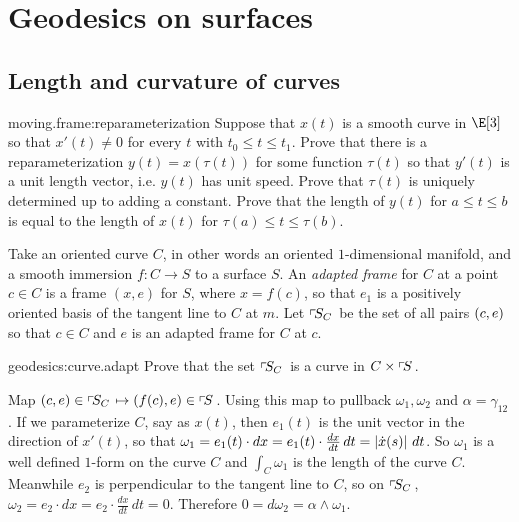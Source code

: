 \chapter{Geodesics on surfaces}\label{chapter:geodesics}%

\section{Length and curvature of curves}
\begin{problem}{moving.frame:reparameterization}
Suppose that \(x(t)\) is a smooth curve in \(\E[3]\) so that \(x'(t) \ne 0\) for every \(t\) with \(t_0 \le t \le t_1\).
Prove that there is a reparameterization \(y(t)=x(\tau(t))\) for some function \(\tau(t)\) so that \(y'(t)\) is a unit length vector, i.e. \(y(t)\) has unit speed.
Prove that \(\tau(t)\) is uniquely determined up to adding a constant.
Prove that the length of \(y(t)\) for \(a \le t \le b\) is equal to the length of \(x(t)\) for \(\tau(a) \le t \le \tau(b)\).
\end{problem}
Take an oriented curve \(C\), in other words an oriented \(1\)-dimensional manifold, and a smooth immersion \(f \colon C \to S\) to a surface \(S\).
An \emph{adapted frame}%
for \(C\) at a point \(c \in C\) is a frame \((x,e)\) for \(S\), where \(x=f(c)\), so that \(e_1\) is a positively oriented basis of the tangent line to \(C\) at \(m\).
Let \(\adaptedFrameBundle{C}{S}\) be the set of all pairs \(\pr{c,e}\) so that \(c \in C\) and \(e\) is an adapted frame for \(C\) at \(c\).
\begin{problem}{geodesics:curve.adapt}
Prove that the set \(\adaptedFrameBundle{C}{S}\) is a curve in \(C \times \frameBundle{S}\).
\end{problem}
Map \(\pr{c,e} \in \adaptedFrameBundle{C}{S} \mapsto \pr{f(c),e} \in \frameBundle{S}\).
Using this map to pullback \(\omega_1, \omega_2\) and \(\alpha=\gamma_{12}\).
If we parameterize \(C\), say as \(x(t)\), then \(e_1(t)\) is the unit vector in the direction of \(x'(t)\), so that \(\omega_1=e_1(t) \cdot dx=e_1(t) \cdot \frac{dx}{dt} \, dt=\norm{\dot{x}(s)} \, dt\).
So \(\omega_1\) is a well defined \(1\)-form on the curve \(C\) and \(\int_C \omega_1\) is the length of the curve \(C\).
Meanwhile \(e_2\) is perpendicular to the tangent line to \(C\), so on \(\adaptedFrameBundle{C}{S}\), \(\omega_2=e_2 \cdot dx=e_2 \cdot \frac{dx}{dt} \, dt=0\).
Therefore \(0=d\omega_2=\alpha \wedge \omega_1\).

